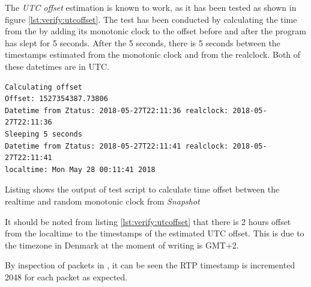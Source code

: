 \noindent{}The \textit{UTC offset} estimation is known to work, as it has been tested as shown in figure \ref{lst:verify:utcoffset}. The test has been conducted by calculating the time from the  by adding its monotonic clock to the offset before and after the program has slept for 5 seconds. After the 5 seconds, there is 5 seconds between the timestamps estimated from the monotonic clock and from the realclock.  Both of these datetimes are in UTC.

\begin{listing}[H] 
\begin{verbatim}
Calculating offset
Offset: 1527354387.73806
Datetime from Ztatus: 2018-05-27T22:11:36 realclock: 2018-05-27T22:11:36
Sleeping 5 seconds
Datetime from Ztatus: 2018-05-27T22:11:41 realclock: 2018-05-27T22:11:41
localtime: Mon May 28 00:11:41 2018
\end{verbatim}
\caption{Listing shows the output of test script to calculate time offset between the realtime and random monotonic clock from \textit{Snapshot}}
\label{lst:verify:utcoffset}
\end{listing}

It should be noted from listing \ref{lst:verify:utcoffset} that there is 2 hours offset from the localtime to the timestamps of the estimated UTC offset.  This is due to the timezone in Denmark at the moment of writing is GMT+2.

\noindent{}By inspection of packets in , it can be seen the RTP timestamp is incremented 2048 for each packet as expected.


